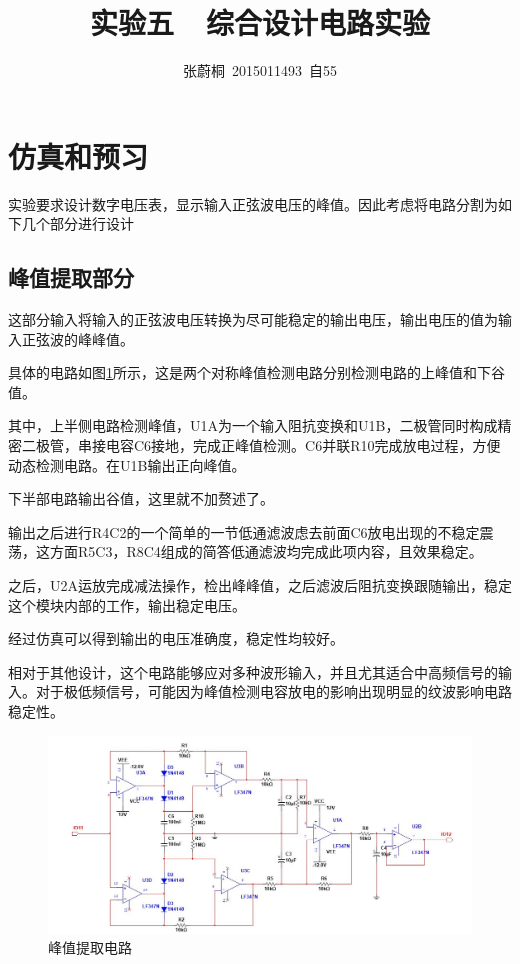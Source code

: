 \documentclass[UTF8,a4paper]{paper}
\title{实验五\ \ 综合设计电路实验}
\author{张蔚桐\ 2015011493\ 自55}
\begin{document}
\maketitle
\tableofcontents
\clearpage
\section{仿真和预习}
实验要求设计数字电压表，显示输入正弦波电压的峰值。因此考虑将电路分割为如下几个部分进行设计
\subsection{峰值提取部分}
这部分输入将输入的正弦波电压转换为尽可能稳定的输出电压，输出电压的值为输入正弦波的峰峰值。

具体的电路如图\ref{PP}所示，这是两个对称峰值检测电路分别检测电路的上峰值和下谷值。

其中，上半侧电路检测峰值，U1A为一个输入阻抗变换和U1B，二极管同时构成精密二极管，串接电容C6接地，完成正峰值检测。C6并联R10完成放电过程，方便动态检测电路。在U1B输出正向峰值。

下半部电路输出谷值，这里就不加赘述了。

输出之后进行R4C2的一个简单的一节低通滤波虑去前面C6放电出现的不稳定震荡，这方面R5C3，R8C4组成的简答低通滤波均完成此项内容，且效果稳定。

之后，U2A运放完成减法操作，检出峰峰值，之后滤波后阻抗变换跟随输出，稳定这个模块内部的工作，输出稳定电压。

经过仿真可以得到输出的电压准确度，稳定性均较好。

相对于其他设计，这个电路能够应对多种波形输入，并且尤其适合中高频信号的输入。对于极低频信号，可能因为峰值检测电容放电的影响出现明显的纹波影响电路稳定性。

\begin{figure}\centering
\includegraphics[width=\textwidth]{PP.jpg}
\caption{峰值提取电路}\label{PP}
\end{figure}
\end{document}
